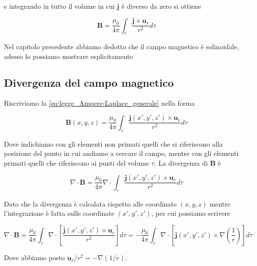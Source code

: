 e integrando in tutto il volume in cui $\mathbf{j}$ è diverso da zero si ottiene 

\begin{tcolorbox}[colback=yellow!10!white, colframe=orange!70!black, boxrule=0.8pt]
\begin{equation}\label{eq:legge_Ampere-Laplace_generale}
    \mathbf{B} = \frac{\mu_0 }{4 \pi} \int_{\tau} \frac{\mathbf{j} \times \mathbf{u}_r}{r^2} d\tau
\end{equation}
\end{tcolorbox}

Nel capitolo precedente abbiamo dedotto che il campo magnetico è solinoidale, adesso lo possiamo mostrare esplicitamente

\subsection{Divergenza del campo magnetico}

Riscriviamo la \ref{eq:legge_Ampere-Laplace_generale} nella forma 

\begin{equation*}
    \mathbf{B}(x,y,z) = \frac{\mu_0 }{4 \pi} \int_{\tau} \frac{\mathbf{j}(x',y',z') \times \mathbf{u}_r}{r^2} d\tau
\end{equation*}

Dove indichiamo con gli elementi non primati quelli che si riferiscono alla posizione del punto in cui andiamo a cercare il campo, mentre con gli elementi primati quelli che riferiscono ai punti del volume $\tau$. La divergenza di $\mathbf{B}$ è 

\begin{equation*}
    \nabla \cdot \mathbf{B} = \frac{\mu_0 }{4 \pi} \nabla \cdot \int_{\tau} \frac{\mathbf{j}(x',y',z') \times \mathbf{u}_r}{r^2} d\tau
\end{equation*}

Dato che la divergenza è calcolata rispetto alle coordinate $(x,y,z)$ mentre l'integrazione è fatta sulle coordinate $(x',y',z')$, per cui possiamo scrivere 

\begin{equation*}
    \nabla \cdot \mathbf{B} = \frac{\mu_0 }{4 \pi} \int_{\tau} \nabla \cdot \left[ \frac{\mathbf{j}(x',y',z') \times \mathbf{u}_r}{r^2} \right] d\tau = - \frac{\mu_0 }{4 \pi} \int_{\tau} \nabla \cdot \left[ \mathbf{j}(x',y',z') \times \nabla \left( \frac{1}{r} \right) \right] d\tau
\end{equation*}

Dove abbiamo posto $\mathbf{u}_r/r^2 = - \nabla(1/r)$. \\

